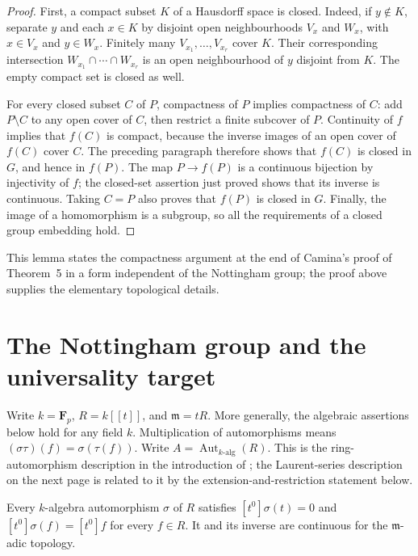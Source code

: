 \begin{proof}
First, a compact subset $K$ of a Hausdorff space is closed. Indeed, if
$y\notin K$, separate $y$ and each $x\in K$ by disjoint open
neighbourhoods $V_x$ and $W_x$, with $x\in V_x$ and $y\in W_x$.
Finitely many $V_{x_1},\ldots,V_{x_r}$ cover $K$. Their corresponding
intersection $W_{x_1}\cap\cdots\cap W_{x_r}$ is an open neighbourhood
of $y$ disjoint from $K$. The empty compact set is closed as well.

For every closed subset $C$ of $P$, compactness of $P$ implies compactness
of $C$: add $P\setminus C$ to any open cover of $C$, then restrict a
finite subcover of $P$. Continuity of $f$ implies that $f(C)$ is compact,
because the inverse images of an open cover of $f(C)$ cover $C$.
The preceding paragraph therefore shows that $f(C)$ is closed in $G$,
and hence in $f(P)$. The map $P\longrightarrow f(P)$ is a continuous
bijection by injectivity of $f$; the closed-set assertion just proved
shows that its inverse is continuous. Taking $C=P$ also proves that
$f(P)$ is closed in $G$. Finally, the image of a homomorphism is a
subgroup, so all the requirements of a closed group embedding hold.
\end{proof}

This lemma states the compactness argument at the end of Camina's proof
of Theorem~5 in a form independent of the Nottingham group; the proof
above supplies the elementary topological details.

\section{The Nottingham group and the universality target}

Write $k=\mathbf F_p$, $R=k[[t]]$, and $\mathfrak m=tR$. More generally,
the algebraic assertions below hold for any field $k$. Multiplication of
automorphisms means $(\sigma\tau)(f)=\sigma(\tau(f))$.
Write $A=\operatorname{Aut}_{k\text{-alg}}(R)$.
This is the ring-automorphism description in the introduction of
\cite{Camina1997}; the Laurent-series description on the next page is
related to it by the extension-and-restriction statement below.

\begin{lemma}
\label{lem:power-series-aut-continuity}
\leanok
Every $k$-algebra automorphism $\sigma$ of $R$ satisfies
$[t^0]\sigma(t)=0$ and $[t^0]\sigma(f)=[t^0]f$ for every $f\in R$.
It and its inverse are continuous for the $\mathfrak m$-adic topology.
\end{lemma}

